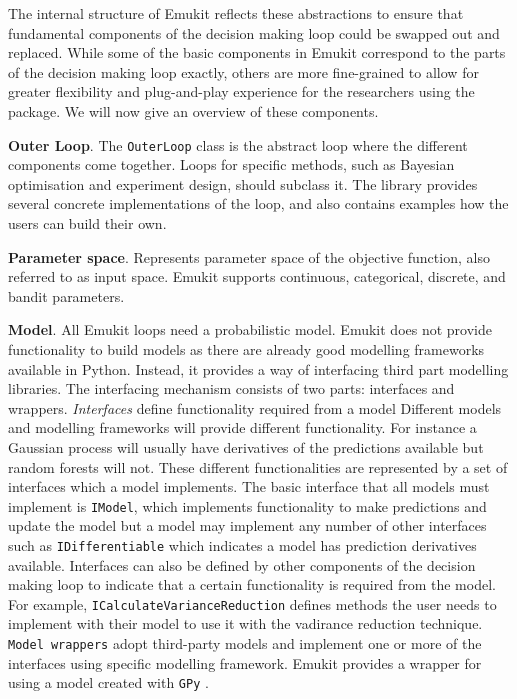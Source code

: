 The internal structure of Emukit reflects these abstractions to ensure that fundamental components of the decision making loop could be swapped out and replaced. While some of the basic components in Emukit correspond to the parts of the decision making loop exactly, others are more fine-grained to allow for greater flexibility and plug-and-play experience for the researchers using the package. We will now give an overview of these components.

\textbf{Outer Loop}. The \texttt{OuterLoop} class is the abstract loop where the different components come together. Loops for specific methods, such as Bayesian optimisation and experiment design, should subclass it. The library provides several concrete implementations of the loop, and also contains examples how the users can build their own.

\textbf{Parameter space}. Represents parameter space of the objective function, also referred to as input space. Emukit supports continuous, categorical, discrete, and bandit parameters.

\textbf{Model}. All Emukit loops need a probabilistic model. Emukit does not provide functionality to build models as there are already good modelling frameworks available in Python. Instead, it provides a way of interfacing third part modelling libraries. The interfacing mechanism consists of two parts: interfaces and wrappers. \textit{Interfaces} define functionality required from a model Different models and modelling frameworks will provide different functionality. For instance a Gaussian process will usually have derivatives of the predictions available but random forests will not. These different functionalities are represented by a set of interfaces which a model implements. The basic interface that all models must implement is \texttt{IModel}, which implements functionality to make predictions and update the model but a model may implement any number of other interfaces such as \texttt{IDifferentiable} which indicates a model has prediction derivatives available. Interfaces can also be defined by other components of the decision making loop to indicate that a certain functionality is required from the model. For example, \texttt{ICalculateVarianceReduction} defines methods the user needs to implement with their model to use it with the vadirance reduction technique. \texttt{Model wrappers} adopt third-party models and implement one or more of the interfaces using specific modelling framework. Emukit provides a wrapper for using a model created with \texttt{GPy} \cite{gpy2014}.


